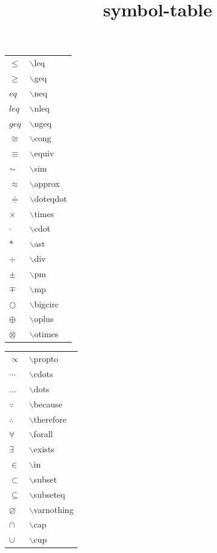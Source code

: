 \documentclass[10pt]{beamer}
\title{symbol-table}
\begin{document}
\begin{frame}
\begin{tabular}{ll}
$\leq$ &  $\backslash$leq \\
$\geq$ &  $\backslash$geq \\
$
eq$ &  $\backslash$neq \\
$
leq$ &  $\backslash$nleq \\
$
geq$ &  $\backslash$ngeq \\
$\cong$ &  $\backslash$cong \\
$\equiv$ &  $\backslash$equiv \\
$\sim$ &  $\backslash$sim \\
$\approx$ &  $\backslash$approx \\
$\doteqdot$ &  $\backslash$doteqdot \\
$\times$ &  $\backslash$times \\
$\cdot $ &  $\backslash$cdot \\
$\ast $ &  $\backslash$ast \\
$\div$ &  $\backslash$div \\
$\pm$ &  $\backslash$pm \\
$\mp$ &  $\backslash$mp \\
$\bigcirc$ &  $\backslash$bigcirc \\
$\oplus$ &  $\backslash$oplus \\
$\otimes$ &  $\backslash$otimes \\
\end{tabular}
\hspace*{1ex}
\begin{tabular}{ll}
$\propto $ &  $\backslash$propto \\
$\cdots $ &  $\backslash$cdots \\
$\dots $ &  $\backslash$dots \\
$\because$ &  $\backslash$because \\
$\therefore$ &  $\backslash$therefore \\
$\forall$ &  $\backslash$forall \\
$\exists$ &  $\backslash$exists \\
$\in$ &  $\backslash$in \\
$\subset $ &  $\backslash$subset \\
$\subseteq $ &  $\backslash$subseteq \\
$\varnothing $ &  $\backslash$varnothing  \\
$\cap $ &  $\backslash$cap \\
$\cup $ &  $\backslash$cup \\

\end{tabular}
\end{frame}
\end{document}
